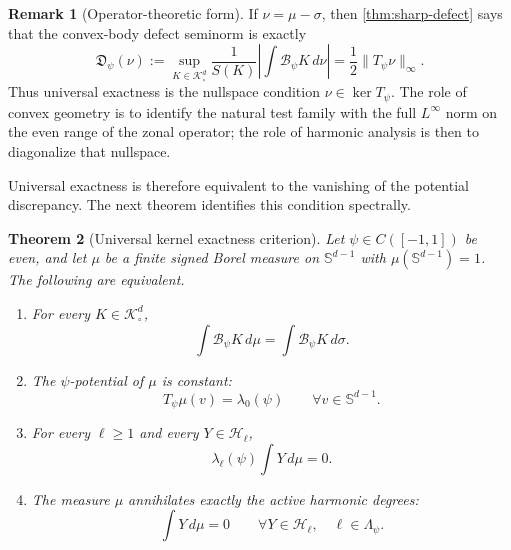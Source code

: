 \documentclass[12pt,a4paper]{article}
\newcommand{\Sph}{\mathbb S}
\newcommand{\K}{\mathcal K}
\newcommand{\Harm}{\mathcal H}
\newcommand{\cB}{\mathcal B}
\theoremstyle{plain}
\newtheorem{theorem}{Theorem}[section]
\theoremstyle{definition}
\newtheorem{remark}[theorem]{Remark}
\begin{document}
\begin{remark}[Operator-theoretic form]\label{rem:operator-form}
If $\nu=\mu-\sigma$, then \cref{thm:sharp-defect} says that the convex-body defect seminorm is exactly
\[
 \mathfrak D_\psi(\nu):=
 \sup_{K\in\K^d_\circ}\frac{1}{S(K)}
 \left|\int\cB_\psi K\,d\nu\right|
 =\frac12\|T_\psi\nu\|_\infty.
\]
Thus universal exactness is the nullspace condition $\nu\in\ker T_\psi$. The role of convex geometry is to identify the natural test family with the full $L^\infty$ norm on the even range of the zonal operator; the role of harmonic analysis is then to diagonalize that nullspace.
\end{remark}

Universal exactness is therefore equivalent to the vanishing of the potential discrepancy. The next theorem identifies this condition spectrally.

\begin{theorem}[Universal kernel exactness criterion]\label{thm:main-criterion}
Let $\psi\in C([-1,1])$ be even, and let $\mu$ be a finite signed Borel measure on $\Sph^{d-1}$ with $\mu(\Sph^{d-1})=1$.  The following are equivalent.
\begin{enumerate}
\item For every $K\in\K^d_\circ$,
\begin{equation}\label{eq:main-i}
 \int\cB_\psi K\,d\mu
 =\int\cB_\psi K\,d\sigma.
\end{equation}
\item The $\psi$-potential of $\mu$ is constant:
\begin{equation}\label{eq:main-ii}
 T_\psi\mu(v)=\lambda_0(\psi)
 \qquad\forall v\in\Sph^{d-1}.
\end{equation}
\item For every $\ell\ge1$ and every $Y\in\Harm_\ell$,
\begin{equation}\label{eq:main-iii}
 \lambda_\ell(\psi)\int Y\,d\mu=0.
\end{equation}
\item The measure $\mu$ annihilates exactly the active harmonic degrees:
\begin{equation}\label{eq:main-iv}
 \int Y\,d\mu=0
 \qquad\forall Y\in\Harm_\ell,
 \quad \ell\in\Lambda_\psi.
\end{equation}
\end{enumerate}
\end{theorem}
\end{document}
